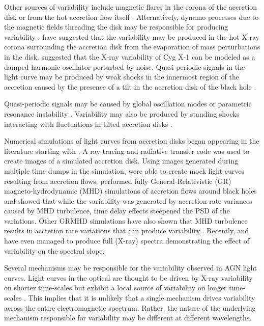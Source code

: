\documentclass[a4paper,fleqn,usenatbib]{mnras}
\begin{document}
Other sources of variability include magnetic flares in the corona of the accretion disk \citep{PoutanenFabian99} or from the hot accretion flow itself \citep{Veledina13}. Alternatively, dynamo processes due to the magnetic fields threading the disk may be responsible for producing variability \citep{LivioPringleKing03,King04,MayerPringle06}. \citet{JaniukCzerny07} have suggested that the variability may be produced in the hot X-ray corona surrounding the accretion disk from the evaporation of mass perturbations in the disk. \citet{Misra08} suggested that the X-ray variability of Cyg X-1 can be modeled as a damped harmonic oscillator perturbed by noise. Quasi-periodic signals in the light curve may be produced by weak shocks in the innermost region of the accretion caused by the presence of a tilt in the accretion disk of the black hole \citep{FragileBlaes07,FragileBlaes08}.

Quasi-periodic signals may be caused by global oscillation modes or parametric resonance instability \citep{ReynoldsMiller09a,ReynoldsMiller09b,Oneill11}. Variability may also be produced by standing shocks interacting with fluctuations in tilted accretion disks \citep{Henisey12}.

Numerical simulations of light curves from accretion disks began appearing in the literature starting with \citet{Schnittman06}. A ray-tracing and radiative transfer code was used to create images of a simulated accretion disk. Using images generated during multiple time dumps in the simulation, \citet{Schnittman06} were able to create mock light curves resulting from accretion flows. \citet{Noble09} performed fully General-Relativistic (GR) magneto-hydrodynamic (MHD) simulations of accretion flows around black holes and showed that while the variability was generated by accretion rate variances caused by MHD turbulence, time delay effects steepened the PSD of the variations. Other GRMHD simulations have also shown that MHD turbulence results in accretion rate variations that can produce variability \citep{Moscibrodzka09,Dexter09,Dexter10}. Recently, \citet{Schnittman13a} and \citet{Schnittman13b} have even managed to produce full (X-ray) spectra demonstrating the effect of variability on the spectral slope.

Several mechanisms may be responsible for the variability observed in AGN light curves. Light curves in the optical are thought to be driven by X-ray variability on shorter time-scales but exhibit a local source of variability on longer time-scales \citep{UttleyAccretion}. This implies that it is unlikely that a single mechanism drives variability across the entire electromagnetic spectrum. Rather, the nature of the underlying mechanism responsible for variability may be different at different wavelengths.
\end{document}
